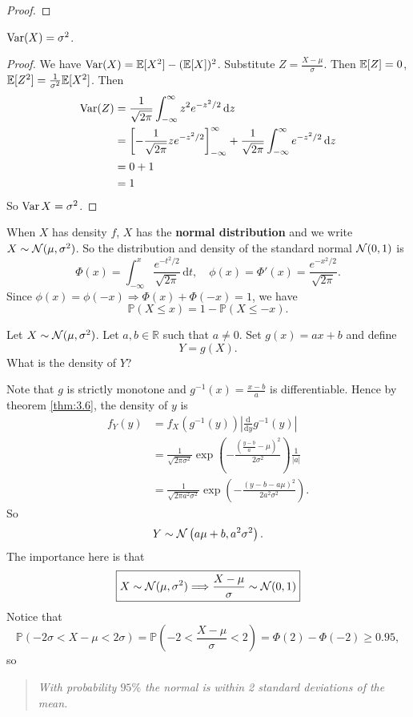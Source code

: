 \begin{example}
\begin{proof}
    \end{proof}
    \begin{proposition}
    $\operatorname{Var}(X) = \sigma^2$.
    \end{proposition}
    \begin{proof}
    We have $\operatorname{Var} (X) = {\mathbb{E}}[X^2] - ({\mathbb{E}}[X])^2$. Substitute $Z = \frac{X - \mu}{\sigma}$. Then ${\mathbb{E}}[Z] = 0$, ${\mathbb{E}}[Z^2] = \frac{1}{\sigma^2}{\mathbb{E}}[X^2]$. Then
    \begin{align*}
        \operatorname{Var}(Z) &= \frac{1}{\sqrt{2\pi}} \int_{-\infty}^\infty z^2 e^{-z^2/2}\,\mathrm{d} z\\
        &= \left[-\frac{1}{\sqrt{2\pi}}ze^{-z^2/2}\right]_{-\infty}^\infty + \frac{1}{\sqrt{2\pi}}\int_{-\infty}^\infty e^{-z^2/2}\,\mathrm{d} z\\
        &= 0 + 1\\
        &= 1
    \end{align*}
    So $\operatorname{Var} X = \sigma^2$.
    \end{proof}
    When $X$ has density $ f $, $X$ has the \textbf{normal distribution} and we write $ X \sim {\mathcal{N}}(\mu,\sigma^2) $. So the distribution and density of the standard normal $ {\mathcal{N}}(0,1) $ is
    \[
        \Phi(x)=\int_{-\infty}^x\frac{e^{-t^2/2}}{\sqrt{2\pi}}\,\mathrm dt,\quad\phi(x)=\Phi'(x)=\frac{e^{-x^2/2}}{\sqrt{2\pi}}.
    \]
    Since $ \phi(x)=\phi(-x) \Rightarrow \Phi(x)+\Phi(-x)=1 $, we have 
    \[
        \mathbb{P}(X\le x)=1-\mathbb{P}(X\le -x).
    \]
\end{example}

\begin{example}
    Let $ X \sim {\mathcal{N}}( \mu,\sigma^2) $. Let $ a,b\in \mathbb{R} $ such that $ a\neq 0 $. Set $ g(x)=ax+b $ and define 
    \[
        Y= g(X).
    \]
    What is the density of $Y$?

    Note that $g$ is strictly monotone and $ g^{-1}(x)=\frac{x-b}{a} $ is differentiable. Hence by theorem \ref{thm:3.6}, the density of $y$ is 
    \begin{align*}
        f_Y(y)&= f_X(g^{-1}(y)) \left| \frac{\mathrm{d}}{\mathrm{d}y} g^{-1}(y)  \right| \\ 
        &= \frac{1}{\sqrt{2\pi\sigma^2}}\exp\left(-\frac{(\frac{y-b}{a} - \mu)^2}{2\sigma^2}\right) \frac{1}{|a|}\\ 
        &= \frac{1}{\sqrt{2\pi a^2\sigma^2}} \exp \left( -\frac{(y-b - a\mu)^2}{2a^2\sigma^2} \right).
    \end{align*}
    So 
    \[
        Y \sim {\mathcal{N}}\left( a\mu+b, a^2\sigma ^2 \right).
    \]
    The importance here is that 
    \[
        \boxed{X \sim {\mathcal{N}}(\mu,\sigma^2) \Longrightarrow \frac{X-\mu}{\sigma}\sim {\mathcal{N}}(0,1)}
    \]
    Notice that 
    \[
        \mathbb{P}(-2\sigma<X-\mu<2\sigma)=\mathbb{P}\left( -2<\frac{X-\mu}{\sigma}<2 \right)=\Phi(2)-\Phi(-2)\ge 0.95,
    \]
    so 
    \begin{quote}
        \textit{With probability $ 95\% $ the normal is within 2 standard deviations of the mean.}
    \end{quote}
\end{example}
